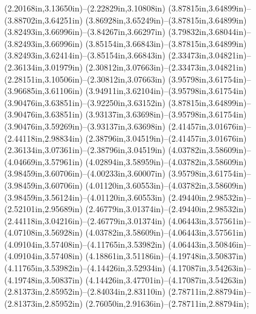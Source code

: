 (2.20168in,3.13650in)--(2.22829in,3.10808in) (3.87815in,3.64899in)--(3.88702in,3.64251in) (3.86928in,3.65249in)--(3.87815in,3.64899in) (3.82493in,3.66996in)--(3.84267in,3.66297in) (3.79832in,3.68044in)--(3.82493in,3.66996in) (3.85154in,3.66843in)--(3.87815in,3.64899in) (3.82493in,3.62414in)--(3.85154in,3.66843in) (2.33473in,3.04821in)--(2.36134in,3.01979in) (2.30812in,3.07663in)--(2.33473in,3.04821in) (2.28151in,3.10506in)--(2.30812in,3.07663in) (3.95798in,3.61754in)--(3.96685in,3.61106in) (3.94911in,3.62104in)--(3.95798in,3.61754in) (3.90476in,3.63851in)--(3.92250in,3.63152in) (3.87815in,3.64899in)--(3.90476in,3.63851in) (3.93137in,3.63698in)--(3.95798in,3.61754in) (3.90476in,3.59269in)--(3.93137in,3.63698in) (2.41457in,3.01676in)--(2.44118in,2.98834in) (2.38796in,3.04519in)--(2.41457in,3.01676in) (2.36134in,3.07361in)--(2.38796in,3.04519in) (4.03782in,3.58609in)--(4.04669in,3.57961in) (4.02894in,3.58959in)--(4.03782in,3.58609in) (3.98459in,3.60706in)--(4.00233in,3.60007in) (3.95798in,3.61754in)--(3.98459in,3.60706in) (4.01120in,3.60553in)--(4.03782in,3.58609in) (3.98459in,3.56124in)--(4.01120in,3.60553in) (2.49440in,2.98532in)--(2.52101in,2.95689in) (2.46779in,3.01374in)--(2.49440in,2.98532in) (2.44118in,3.04216in)--(2.46779in,3.01374in) (4.06443in,3.57561in)--(4.07108in,3.56928in) (4.03782in,3.58609in)--(4.06443in,3.57561in) (4.09104in,3.57408in)--(4.11765in,3.53982in) (4.06443in,3.50846in)--(4.09104in,3.57408in) (4.18861in,3.51186in)--(4.19748in,3.50837in) (4.11765in,3.53982in)--(4.14426in,3.52934in) (4.17087in,3.54263in)--(4.19748in,3.50837in) (4.14426in,3.47701in)--(4.17087in,3.54263in) (2.81373in,2.85952in)--(2.84034in,2.83110in) (2.78711in,2.88794in)--(2.81373in,2.85952in) (2.76050in,2.91636in)--(2.78711in,2.88794in);

